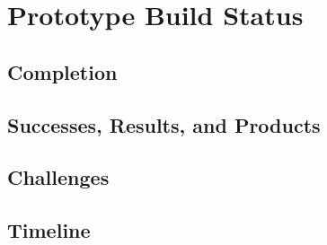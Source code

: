 \documentclass{../tex/report}
\begin{document}
\clearpage



\clearpage



\clearpage



\clearpage




% 

\section{Prototype Build Status}

\subsection{Completion}


\subsection{Successes, Results, and Products}


\subsection{Challenges}


\subsection{Timeline}
\end{document}
